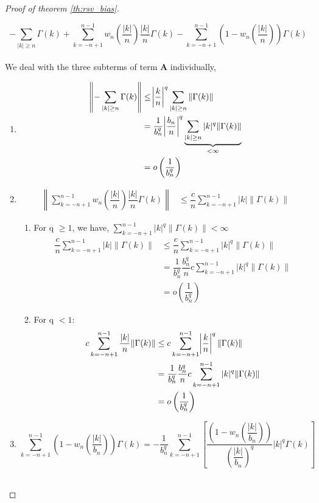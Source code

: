 \documentclass[12pt]{article}
\begin{document}
\begin{proof}[Proof of theorem \ref{th:rsv_bias}]
\begin{enumerate}
$$-\sum_{|k|\geq n}\Gamma(k) + \sum_{k = -n+1}^{n-1}w_n\left(\dfrac{|k|}{n}\right)\dfrac{|k|}{n}\Gamma(k)- \sum_{k = -n+1}^{n-1}\left(1-w_n\left(\dfrac{|k|}{n}\right)\right)\Gamma(k)$$\\

We deal with the three subterms of term \textbf{A} individually,
\begin{enumerate}
    \item 
    \begin{align*}
        \left\|{-\sum_{|k|\geq n}\Gamma(k)}\right\| &\leq   \abs{\dfrac{k}{n}}^q\sum_{|k|\geq n}\|\Gamma(k)\|\\
        &= \dfrac{1}{b_n^q}\abs{\dfrac{b_n}{n}}^q\underbrace{\sum_{|k|\geq n}|k|^q\|\Gamma(k)\|}_{<\infty}\\
        &= o\left(\dfrac{1}{b_n^q}\right)
    \end{align*}
    
    \item
\begin{align*}
   \left\| \sum_{k = -n+1}^{n-1}w_n\left(\dfrac{|k|}{n}\right)\dfrac{|k|}{n}\Gamma(k)\right\| &\leq \dfrac{c}{n}\sum_{k = -n+1}^{n-1}|k|\|\Gamma(k)\| 
\end{align*}
 
 \begin{enumerate}
     \item For q $\geq 1$, we have, $\sum_{k=-n+1}^{n-1}|k|^q\|\Gamma(k)\| < \infty$
     \begin{align*}
         \dfrac{c}{n}\sum_{k = -n+1}^{n-1}|k|\|\Gamma(k)\| &\leq \dfrac{c}{n}\sum_{k = -n+1}^{n-1}|k|^q\|\Gamma(k)\|\\
         &= \dfrac{1}{b_n^q}\dfrac{b_n^q}{n}c\sum_{k = -n+1}^{n-1}|k|^q\|\Gamma(k)\|\\
         &= o\left(\dfrac{1}{b_n^q}\right) 
     \end{align*}
     
     
     \item For q $<1$:\\
     \begin{align*}
         c\sum_{k =-n+1}^{n-1}\dfrac{|k|}{n}\|\Gamma(k)\| &\leq c\sum_{k =-n+1}^{n-1}\abs{\dfrac{k}{n}}^q\|\Gamma(k)\|\\
         &= \dfrac{1}{b_n^q}\dfrac{b_n^q}{n}c\sum_{k =-n+1}^{n-1}|k|^q\|\Gamma(k)\|\\
         &= o\left(\dfrac{1}{b_n^q}\right) 
     \end{align*}
     \end{enumerate}
     \item 
     $$\sum_{k = -n+1}^{n-1}\left(1-w_n\left(\dfrac{|k|}{b_n}\right)\right)\Gamma(k) = -\dfrac{1}{b_n^q}\sum_{k = -n+1}^{n-1}\left[\dfrac{\left(1-w_n\left(\dfrac{|k|}{b_n}\right)\right)}{\left(\dfrac{|k|}{b_n}\right)^q}|k|^q \Gamma(k)\right]$$\\
     

\end{enumerate}
\end{enumerate}
\end{proof}
\end{document}
